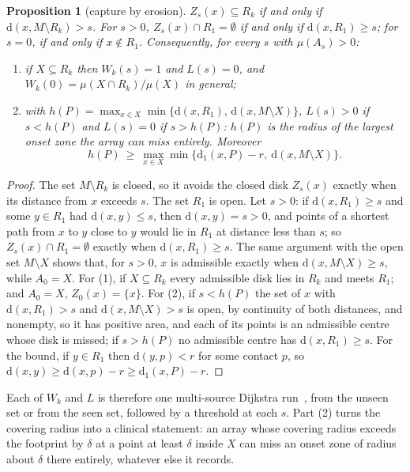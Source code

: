 \documentclass[11pt]{amsart}
\newtheorem{proposition}[theorem]{Proposition}
\theoremstyle{definition}
\theoremstyle{remark}
\newcommand{\dd}{\mathrm{d}}
\begin{document}
\begin{proposition}[capture by erosion]\label{prop:erosion}
$Z_s(x)\subseteq R_k$ if and only if $\dd(x,M\setminus R_k)>s$. For $s>0$,
$Z_s(x)\cap R_1=\emptyset$ if and only if $\dd(x,R_1)\ge s$; for $s=0$, if
and only if $x\notin R_1$. Consequently, for every $s$ with $\mu(A_s)>0$:
\begin{enumerate}
\item if $X\subseteq R_k$ then $W_k(s)=1$ and $L(s)=0$, and
$W_k(0)=\mu(X\cap R_k)/\mu(X)$ in general;
\item with $h(P)=\max_{x\in X}\min\{\dd(x,R_1),\,\dd(x,M\setminus X)\}$,
$L(s)>0$ if $s<h(P)$ and $L(s)=0$ if $s>h(P)$: $h(P)$ is the radius of the
largest onset zone the array can miss entirely. Moreover
\[
h(P)\ \ge\ \max_{x\in X}\min\{\dd_1(x,P)-r,\ \dd(x,M\setminus X)\}.
\]
\end{enumerate}
\end{proposition}

\begin{proof}
The set $M\setminus R_k$ is closed, so it avoids the closed disk $Z_s(x)$
exactly when its distance from $x$ exceeds $s$. The set $R_1$ is open. Let
$s>0$: if $\dd(x,R_1)\ge s$ and some $y\in R_1$ had $\dd(x,y)\le s$, then
$\dd(x,y)=s>0$, and points of a shortest path from $x$ to $y$ close to $y$
would lie in $R_1$ at distance less than $s$; so $Z_s(x)\cap R_1=\emptyset$
exactly when $\dd(x,R_1)\ge s$. The same argument with the open set
$M\setminus X$ shows that, for $s>0$, $x$ is admissible exactly when
$\dd(x,M\setminus X)\ge s$, while $A_0=X$. For (1),
if $X\subseteq R_k$ every admissible disk lies in $R_k$ and meets $R_1$; and
$A_0=X$, $Z_0(x)=\{x\}$. For (2), if $s<h(P)$ the set of $x$ with
$\dd(x,R_1)>s$ and $\dd(x,M\setminus X)>s$ is open, by continuity of both
distances, and nonempty, so it has positive area, and each of its points is an
admissible centre whose disk is missed; if $s>h(P)$ no admissible centre has
$\dd(x,R_1)\ge s$. For the bound, if $y\in R_1$ then $\dd(y,p)<r$ for some
contact $p$, so $\dd(x,y)\ge\dd(x,p)-r\ge\dd_1(x,P)-r$.
\end{proof}

Each of $W_k$ and $L$ is therefore one multi-source Dijkstra
run~\cite{Dijkstra1959}, from the unseen set or from the seen set, followed by
a threshold at each $s$. Part (2) turns the covering radius into a clinical
statement: an array whose covering radius exceeds the footprint by $\delta$ at
a point at least $\delta$ inside $X$ can miss an onset zone of radius about
$\delta$ there entirely, whatever else it records.
\end{document}
